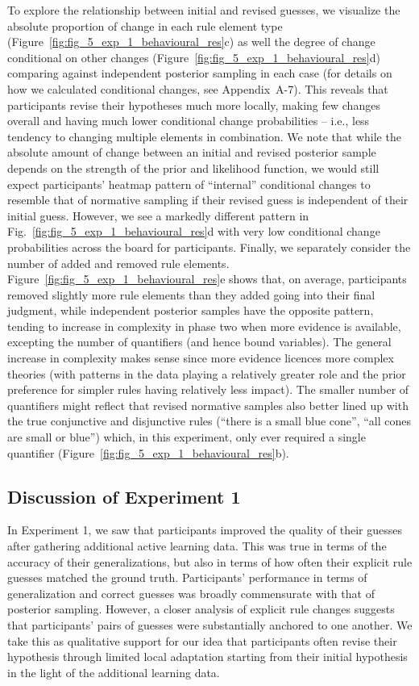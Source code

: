\documentclass[doc,natbib,floatsintext]{apa7}
\begin{document}
To explore the relationship between initial and revised guesses, we visualize the absolute proportion of change in each rule element type (Figure~\ref{fig:fig_5_exp_1_behavioural_res}c) as well the degree of change conditional on other changes (Figure~\ref{fig:fig_5_exp_1_behavioural_res}d) comparing against independent posterior sampling in each case (for details on how we calculated conditional changes, see Appendix~A-7). This reveals that participants revise their hypotheses much more locally, making few changes overall and having much lower conditional change probabilities -- i.e., less tendency to changing multiple elements in combination. We note that while the absolute amount of change between an initial and revised posterior sample depends on the strength of the prior and likelihood function, we would still expect participants' heatmap pattern of ``internal'' conditional changes to resemble that of normative sampling if their revised guess is independent of their initial guess. However, we see a markedly different pattern in Fig.~\ref{fig:fig_5_exp_1_behavioural_res}d with very low conditional change probabilities across the board for participants. Finally, we separately consider the number of added and removed rule elements. Figure~\ref{fig:fig_5_exp_1_behavioural_res}e shows that, on average, participants removed slightly more rule elements than they added going into their final judgment, while independent posterior samples have the opposite pattern, tending to increase in complexity in phase two when more evidence is available, excepting the number of quantifiers (and hence bound variables). The general increase in complexity makes sense since more evidence licences more complex theories (with patterns in the data playing a relatively greater role and the prior preference for simpler rules having relatively less impact). The smaller number of quantifiers might reflect that revised normative samples also better lined up with the true conjunctive and disjunctive rules (``there is a small blue cone'', ``all cones are small or blue'') which, in this experiment, only ever required a single quantifier (Figure~\ref{fig:fig_5_exp_1_behavioural_res}b).

\subsection{Discussion of Experiment 1}
In Experiment 1, we saw that participants improved the quality of their guesses after gathering additional active learning data. This was true in terms of the accuracy of their generalizations, but also in terms of how often their explicit rule guesses matched the ground truth. Participants' performance in terms of generalization and correct guesses was broadly commensurate with that of posterior sampling. However, a closer analysis of explicit rule changes suggests that participants' pairs of guesses were substantially anchored to one another. We take this as qualitative support for our idea that participants often revise their hypothesis through limited local adaptation starting from their initial hypothesis in the light of the additional learning data. 
\end{document}
